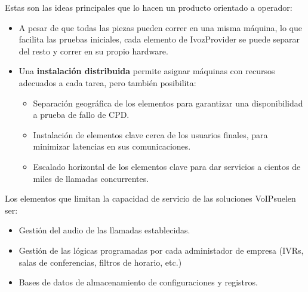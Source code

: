 \documentclass[letterpaper,10pt,spanish]{sphinxmanual}
\begin{document}
Estas son las ideas principales que lo hacen un producto orientado a operador:
\begin{itemize}
\item {} 
A pesar de que todas las piezas pueden correr en una misma máquina, lo que facilita las pruebas iniciales, cada elemento de IvozProvider se puede separar del resto y correr en su propio hardware.

\item {} 
Una \textbf{instalación distribuida} permite asignar máquinas con recursos adecuados a cada tarea, pero también posibilita:
\begin{itemize}
\item {} 
Separación geográfica de los elementos para garantizar una disponibilidad a prueba de fallo de CPD.

\item {} 
Instalación de elementos clave cerca de los usuarios finales, para minimizar latencias en sus comunicaciones.

\item {} 
Escalado horizontal de los elementos clave para dar servicios a cientos de miles de llamadas concurrentes.

\end{itemize}

\end{itemize}

Los elementos que limitan la capacidad de servicio de las soluciones VoIPsuelen ser:
\begin{itemize}
\item {} 
Gestión del audio de las llamadas establecidas.

\item {} 
Gestión de las lógicas programadas por cada administador de empresa (IVRs, salas de conferencias, filtros de horario, etc.)

\item {} 
Bases de datos de almacenamiento de configuraciones y registros.

\end{itemize}
\end{document}
